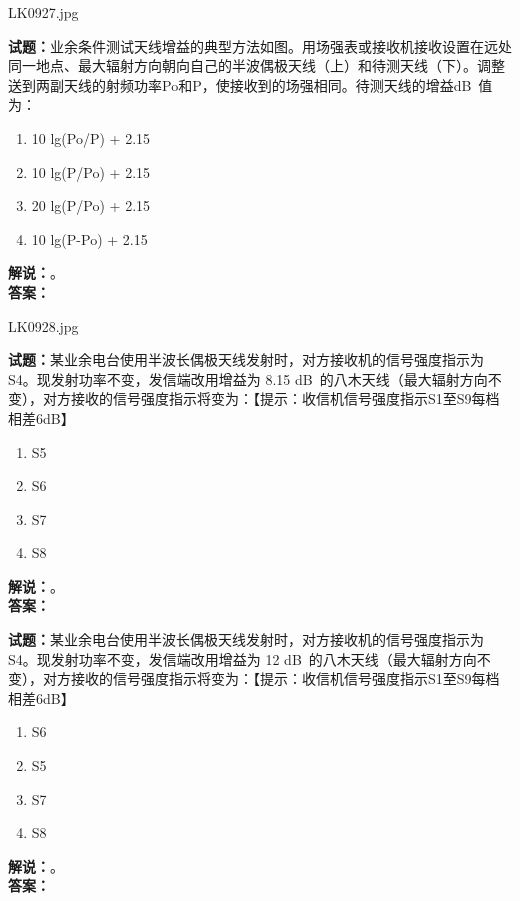 \documentclass{ctexbook}
\begin{document}
\bigskip

LK0927.jpg

\noindent\textbf{试题：}业余条件测试天线增益的典型方法如图。用场强表或接收机接收设置在远处同一地点、最大辐射方向朝向自己的半波偶极天线（上）和待测天线（下）。调整送到两副天线的射频功率Po和P，使接收到的场强相同。待测天线的增益\unit[qualifier-mode=combine]{\deci\bel{}}值为：
\begin{enumerate}[leftmargin=3em]
  \item 10 lg(Po/P) + 2.15
  \item 10 lg(P/Po) + 2.15
  \item 20 lg(P/Po) + 2.15
  \item 10 lg(P-Po) + 2.15
\end{enumerate}
\noindent\textbf{解说：}\textbf{}。\\\noindent\textbf{答案：}

\bigskip

LK0928.jpg

\noindent\textbf{试题：}某业余电台使用半波长偶极天线发射时，对方接收机的信号强度指示为S4。现发射功率不变，发信端改用增益为 8.15 \unit[qualifier-mode=combine]{\deci\bel{}}的八木天线（最大辐射方向不变），对方接收的信号强度指示将变为：【提示：收信机信号强度指示S1至S9每档相差6dB】
\begin{enumerate}[leftmargin=3em]
  \item S5
  \item S6
  \item S7
  \item S8
\end{enumerate}
\noindent\textbf{解说：}\textbf{}。\\\noindent\textbf{答案：}

\bigskip

\noindent\textbf{试题：}某业余电台使用半波长偶极天线发射时，对方接收机的信号强度指示为S4。现发射功率不变，发信端改用增益为 12 \unit[qualifier-mode=combine]{\deci\bel{}}的八木天线（最大辐射方向不变），对方接收的信号强度指示将变为：【提示：收信机信号强度指示S1至S9每档相差6dB】
\begin{enumerate}[leftmargin=3em]
  \item S6
  \item S5
  \item S7
  \item S8
\end{enumerate}
\noindent\textbf{解说：}\textbf{}。\\\noindent\textbf{答案：}

\bigskip
\end{document}
